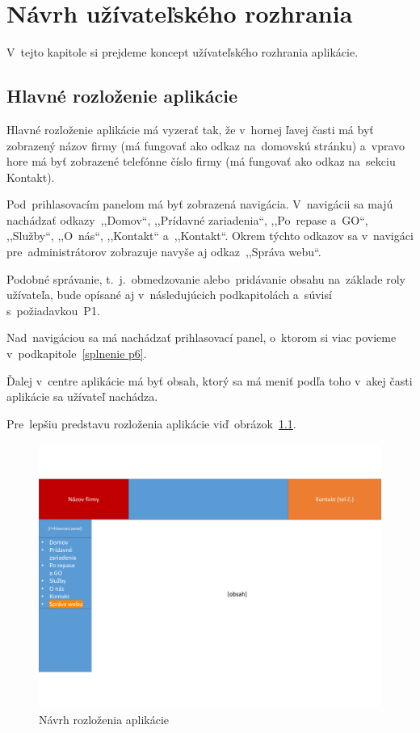 \chapter{Návrh užívateľského rozhrania}

V~tejto kapitole si prejdeme koncept užívateľského rozhrania aplikácie.

\section{Hlavné rozloženie aplikácie}

Hlavné rozloženie aplikácie má vyzerať tak, že v~hornej ľavej časti má byť zobrazený názov firmy (má fungovať ako odkaz na~domovskú stránku) a~vpravo hore má byť zobrazené telefónne číslo firmy (má fungovať ako odkaz na~sekciu Kontakt).

Pod~prihlasovacím panelom má byť zobrazená navigácia. V~navigácii sa majú nachádzať odkazy~,,Domov``, ,,Prídavné zariadenia``, ,,Po~repase a~GO``, ,,Služby``, ,,O~nás``, ,,Kontakt`` a~,,Kontakt``. Okrem týchto odkazov sa v~navigáci pre~administrátorov zobrazuje navyše aj odkaz~,,Správa webu``.

Podobné správanie, t.~j.~obmedzovanie alebo~pridávanie obsahu na~základe roly užívateľa, bude opísané aj v~následujúcich podkapitolách a~súvisí s~požiadavkou~P1.

Nad~navigáciou sa má nachádzať prihlasovací panel, o~ktorom si viac povieme v~podkapitole~\ref{splnenie p6}.

Ďalej v~centre aplikácie má byť obsah, ktorý sa má meniť podľa toho v~akej časti aplikácie sa užívateľ nachádza.

Pre~lepšiu predstavu rozloženia aplikácie viď~obrázok~\ref{layout}. 

\begin{figure}[H]\centering
\includegraphics[width=140mm]{../img/UI concept/layout}
\caption{Návrh rozloženia aplikácie}
\label{layout}
\end{figure}

